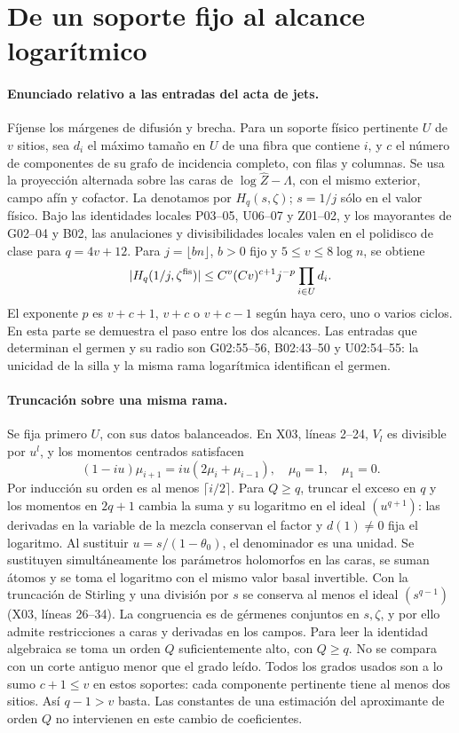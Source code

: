 \section{De un soporte fijo al alcance logarítmico}
\paragraph{Enunciado relativo a las entradas del acta de jets.}
Fíjense los márgenes de difusión y brecha. Para un soporte físico pertinente $U$ de $v$ sitios,
sea $d_i$ el máximo tamaño en $U$ de una fibra que contiene $i$, y $c$ el número de componentes
de su grafo de incidencia completo, con filas y columnas. Se usa la proyección alternada
sobre las caras de $\log\widehat Z-\Lambda$, con el mismo exterior, campo afín y cofactor.
La denotamos por $H_q(s,\zeta)$; $s=1/j$ sólo en el valor físico.
Bajo las identidades locales P03--05, U06--07 y Z01--02, y los mayorantes de G02--04 y B02,
las anulaciones y divisibilidades locales valen en el polidisco de clase para $q=4v+12$.
Para $j=\lfloor bn\rfloor$, $b>0$ fijo y $5\le v\le8\log n$, se obtiene
\[
 |H_q(1/j,\zeta^{\rm fis})|\le C^v(Cv)^{c+1}j^{-p}\prod_{i\in U}d_i .
\]
El exponente $p$ es $v+c+1$, $v+c$ o $v+c-1$ según haya cero, uno o varios ciclos.
En esta parte se demuestra el paso entre los dos alcances. Las entradas que determinan
el germen y su radio son G02:55--56, B02:43--50 y U02:54--55:
la unicidad de la silla y la misma rama logarítmica identifican el germen.

\paragraph{Truncación sobre una misma rama.}
Se fija primero $U$, con sus datos balanceados. En X03, líneas 2--24, $V_l$ es divisible
por $u^l$, y los momentos centrados satisfacen
\[
 (1-iu)\mu_{i+1}=iu(2\mu_i+\mu_{i-1}),\quad \mu_0=1,\quad\mu_1=0 .
\]
Por inducción su orden es al menos $\lceil i/2\rceil$. Para $Q\ge q$, truncar el exceso
en $q$ y los momentos en $2q+1$ cambia la suma y su logaritmo en el ideal $(u^{q+1})$:
las derivadas en la variable de la mezcla conservan el factor y $d(1)\ne0$ fija el logaritmo.
Al sustituir $u=s/(1-\theta_0)$, el denominador es una unidad. Se sustituyen simultáneamente
los parámetros holomorfos en las caras, se suman átomos y se toma el logaritmo con el mismo
valor basal invertible. Con la truncación de Stirling y una división por $s$ se conserva
al menos el ideal $(s^{q-1})$ (X03, líneas 26--34). La congruencia es de gérmenes
conjuntos en $s,\zeta$, y por ello admite restricciones a caras y derivadas en los campos.
Para leer la identidad algebraica se toma un orden $Q$ suficientemente alto, con $Q\ge q$.
No se compara con un corte antiguo menor que el grado leído. Todos los grados usados
son a lo sumo $c+1\le v$ en estos soportes: cada componente pertinente tiene al menos dos sitios.
Así $q-1>v$ basta. Las constantes de una estimación del aproximante de orden $Q$
no intervienen en este cambio de coeficientes.

